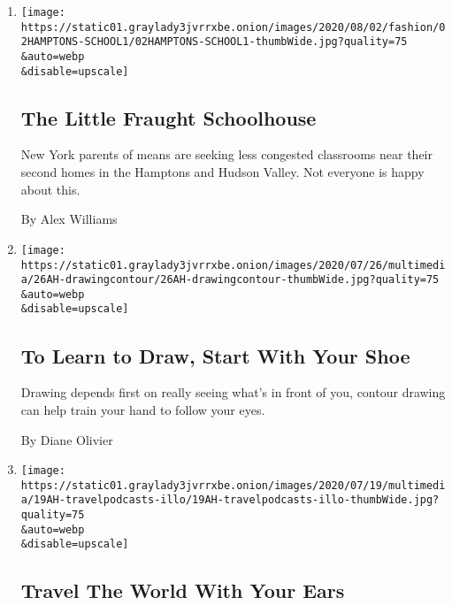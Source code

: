 \begin{enumerate}
\def\labelenumi{\arabic{enumi}.}
\item
  \href{/2020/08/01/style/wealthy-rich-parents-coronavirus-schools-hamptons.html}{}

  \texttt{[image: https://static01.graylady3jvrrxbe.onion/images/2020/08/02/fashion/02HAMPTONS-SCHOOL1/02HAMPTONS-SCHOOL1-thumbWide.jpg?quality=75\\\&auto=webp\\\&disable=upscale]}

  \hypertarget{the-little-fraught-schoolhouse}{%
  \subsection{The Little Fraught
  Schoolhouse}\label{the-little-fraught-schoolhouse}}

  New York parents of means are seeking less congested classrooms near
  their second homes in the Hamptons and Hudson Valley. Not everyone is
  happy about this.

  By Alex Williams
\item
  \href{/2020/07/25/at-home/coronavirus-learn-to-draw.html}{}

  \texttt{[image: https://static01.graylady3jvrrxbe.onion/images/2020/07/26/multimedia/26AH-drawingcontour/26AH-drawingcontour-thumbWide.jpg?quality=75\\\&auto=webp\\\&disable=upscale]}

  \hypertarget{to-learn-to-draw-start-with-your-shoe}{%
  \subsection{To Learn to Draw, Start With Your
  Shoe}\label{to-learn-to-draw-start-with-your-shoe}}

  Drawing depends first on really seeing what's in front of you, contour
  drawing can help train your hand to follow your eyes.

  By Diane Olivier
\item
  \href{/2020/07/18/at-home/coronavirus-travel-podcasts.html}{}

  \texttt{[image: https://static01.graylady3jvrrxbe.onion/images/2020/07/19/multimedia/19AH-travelpodcasts-illo/19AH-travelpodcasts-illo-thumbWide.jpg?quality=75\\\&auto=webp\\\&disable=upscale]}

  \hypertarget{travel-the-world-with-your-ears}{%
  \subsection{Travel The World With Your
  Ears}\label{travel-the-world-with-your-ears}}


\end{enumerate}
